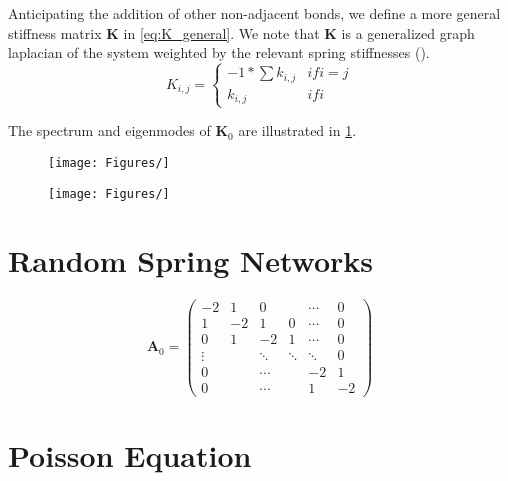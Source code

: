 \documentclass{article}
\begin{document}
Anticipating the addition of other non-adjacent bonds, we define a more general stiffness matrix $\bm{K}$ in \ref{eq:K_general}. 
We note that $\bm{K}$ is a generalized graph laplacian of the system weighted by the relevant spring stiffnesses (\cite{Chung1997-dc}).
\begin{equation}\label{eq:K_general}
	K_{i,j}= \begin{cases}
		-1 * \sum k_{i,j} & if i=j \\
		k_{i,j} & if i
	\end{cases}
\end{equation}

The spectrum and eigenmodes of $\bm{K}_0$ are illustrated in \ref{fig:lattice_spectrum}.

\begin{figure}
\begin{center}
\texttt{[image: Figures/]}
\end{center}
\caption{}
\label{fig:lattice_spectrum}
\end{figure}





\begin{figure}
\begin{center}
	\texttt{[image: Figures/]}
\end{center}
\caption{}
\label{fig:1D_chain}
\end{figure}



\section{Random Spring Networks}


\begin{equation}
	\boldsymbol{A}_0 = 
\begin{pmatrix}
	-2 & 1 & 0 & &\cdots & 0 \\
	1 & -2 & 1 & 0 & \cdots & 0 \\
	0 & 1 & -2 & 1 & \cdots & 0  \\
	\vdots & &\ddots& \ddots  & \ddots & 0\\
	0& & \cdots && -2 & 1\\
	0 & & \cdots & &1& -2
\end{pmatrix}
\end{equation}


\section{Poisson Equation}
\end{document}
